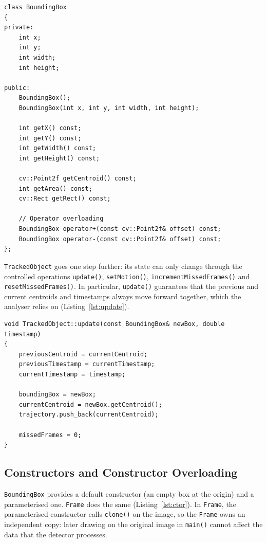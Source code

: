 \documentclass[12pt,a4paper,oneside]{book}
\begin{document}
\begin{minipage}{\linewidth}
\begin{lstlisting}[caption={\texttt{BoundingBox.h}: private data, public \texttt{const} interface.}, label={lst:bbox-h}]
class BoundingBox
{
private:
    int x;
    int y;
    int width;
    int height;

public:
    BoundingBox();
    BoundingBox(int x, int y, int width, int height);

    int getX() const;
    int getY() const;
    int getWidth() const;
    int getHeight() const;

    cv::Point2f getCentroid() const;
    int getArea() const;
    cv::Rect getRect() const;

    // Operator overloading
    BoundingBox operator+(const cv::Point2f& offset) const;
    BoundingBox operator-(const cv::Point2f& offset) const;
};
\end{lstlisting}
\end{minipage}

\texttt{TrackedObject} goes one step further: its state can only change through the controlled operations \texttt{update()}, \texttt{setMotion()}, \texttt{incrementMissedFrames()} and \texttt{resetMissedFrames()}. In particular, \texttt{update()} guarantees that the previous and current centroids and timestamps always move forward together, which the analyser relies on (Listing~\ref{lst:update}).

\begin{minipage}{\linewidth}
\begin{lstlisting}[caption={\texttt{TrackedObject::update()} keeps position, time and history consistent.}, label={lst:update}]
void TrackedObject::update(const BoundingBox& newBox, double timestamp)
{
    previousCentroid = currentCentroid;
    previousTimestamp = currentTimestamp;
    currentTimestamp = timestamp;

    boundingBox = newBox;
    currentCentroid = newBox.getCentroid();
    trajectory.push_back(currentCentroid);

    missedFrames = 0;
}
\end{lstlisting}
\end{minipage}

\subsection{Constructors and Constructor Overloading}
\texttt{BoundingBox} provides a default constructor (an empty box at the origin) and a parameterised one. \texttt{Frame} does the same (Listing~\ref{lst:ctor}). In \texttt{Frame}, the parameterised constructor calls \texttt{clone()} on the image, so the \texttt{Frame} owns an independent copy: later drawing on the original image in \texttt{main()} cannot affect the data that the detector processes.
\end{document}
